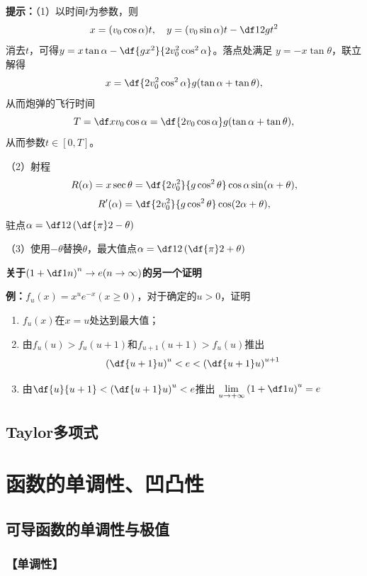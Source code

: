 {\bf 提示：}（1）以时间$t$为参数，则
$$x=(v_0\cos\alpha)t,\quad y=(v_0\sin\alpha)t-\df12gt^2$$
消去$t$，可得$y=x\tan\alpha-\df{gx^2}{2v_0^2\cos^2\alpha}$。落点处满足
$y=-x\tan\theta$，联立解得
$$x=\df{2v_0^2\cos^2\alpha}g(\tan\alpha+\tan\theta),$$
从而炮弹的飞行时间
$$T=\df x{v_0\cos\alpha}=\df{2v_0\cos\alpha}g(\tan\alpha+\tan\theta),$$
从而参数$t\in[0,T]$。

（2）射程
$$R(\alpha)=x\sec\theta=\df{2v_0^2}{g\cos^2\theta}\cos\alpha\sin(\alpha+\theta),$$
$$R'(\alpha)=\df{2v_0^2}{g\cos^2\theta}\cos(2\alpha+\theta),$$
驻点$\alpha=\df12\left(\df{\pi}2-\theta\right)$

（3）使用$-\theta$替换$\theta$，最大值点$\alpha=\df12\left(\df{\pi}2+\theta\right)$

\begin{shaded}

{\bf 关于$\left(1+\df1n\right)^n\to e(n\to\infty)$的另一个证明}

{\bf 例：}$f_u(x)=x^ue^{-x}(x\geq0)$，对于确定的$u>0$，证明
\begin{enumerate}[(1)]
  \setlength{\itemindent}{1cm}
  \item $f_u(x)$在$x=u$处达到最大值；
  \item 由$f_u(u)>f_u(u+1)$和$f_{u+1}(u+1)>f_u(u)$推出
  $$\left(\df{u+1}u\right)^u<e<\left(\df{u+1}u\right)^{u+1}$$
  \item 由$\df{u}{u+1}<\left(\df{u+1}u\right)^u<e$推出
  $\lim\limits_{u\to+\infty}\left(1+\df1u\right)^u=e$
\end{enumerate}

\end{shaded}



\subsection{Taylor多项式}





\section{函数的单调性、凹凸性}

\subsection{可导函数的单调性与极值}

\subsubsection{【单调性】}


